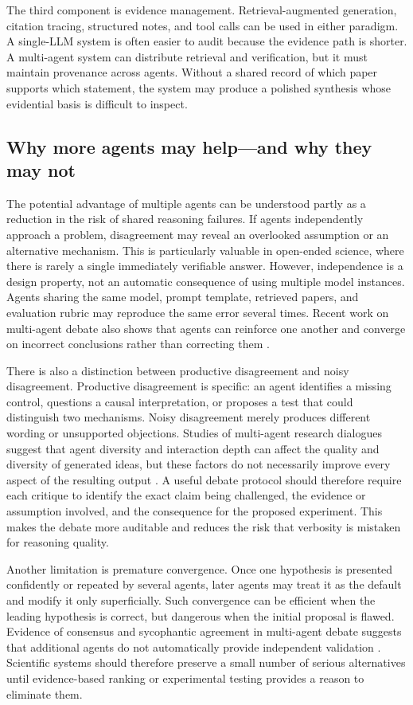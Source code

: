 \documentclass[11pt]{article}
\begin{document}
The third component is evidence management. Retrieval-augmented generation, citation tracing,
structured notes, and tool calls can be used in either paradigm. A single-LLM system is often easier
to audit because the evidence path is shorter. A multi-agent system can distribute retrieval and
verification, but it must maintain provenance across agents. Without a shared record of which paper
supports which statement, the system may produce a polished synthesis whose evidential basis is
difficult to inspect.

\subsection{Why more agents may help---and why they may not}
\label{subsec:more-agents}

The potential advantage of multiple agents can be understood partly as a reduction in the risk of
shared reasoning failures. If agents independently approach a problem, disagreement may reveal an
overlooked assumption or an alternative mechanism. This is particularly valuable in open-ended
science, where there is rarely a single immediately verifiable answer. However, independence is a
design property, not an automatic consequence of using multiple model instances. Agents sharing the
same model, prompt template, retrieved papers, and evaluation rubric may reproduce the same error
several times. Recent work on multi-agent debate also shows that agents can reinforce one another
and converge on incorrect conclusions rather than correcting them \cite{pitre2025consensagent}.

There is also a distinction between productive disagreement and noisy disagreement. Productive
disagreement is specific: an agent identifies a missing control, questions a causal interpretation,
or proposes a test that could distinguish two mechanisms. Noisy disagreement merely produces
different wording or unsupported objections. Studies of multi-agent research dialogues suggest that
agent diversity and interaction depth can affect the quality and diversity of generated ideas, but
these factors do not necessarily improve every aspect of the resulting output
\cite{ueda2025design}. A useful debate protocol should therefore require each critique to identify
the exact claim being challenged, the evidence or assumption involved, and the consequence for the
proposed experiment. This makes the debate more auditable and reduces the risk that verbosity is
mistaken for reasoning quality.

Another limitation is premature convergence. Once one hypothesis is presented confidently or
repeated by several agents, later agents may treat it as the default and modify it only superficially.
Such convergence can be efficient when the leading hypothesis is correct, but dangerous when the
initial proposal is flawed. Evidence of consensus and sycophantic agreement in multi-agent debate
suggests that additional agents do not automatically provide independent validation
\cite{pitre2025consensagent}. Scientific systems should therefore preserve a small number of serious
alternatives until evidence-based ranking or experimental testing provides a reason to eliminate
them.
\end{document}
